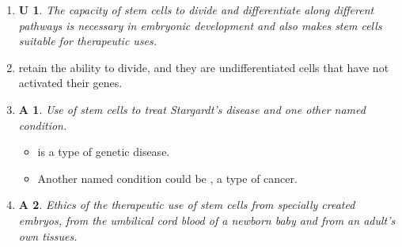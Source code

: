 \documentclass[12pt, a4paper]{article}
\newtheorem{und}{U}[subsection]
\newtheorem{app}{A}[subsection]
\begin{document}
\begin{enumerate}
    \item \begin{und} The capacity of stem cells to divide and differentiate along different pathways is necessary in embryonic development and also makes stem cells suitable for therapeutic uses.\end{und}
    \item \textbf{\color{red}{Stem cells}} retain the ability to divide, and they are undifferentiated cells that have not activated their genes. 
    \item \begin{app} Use of stem cells to treat Stargardt's disease and one other named condition. \end{app}
    \begin{itemize}
        \item \textbf{\color{red}{Stargardt's disease}} is a type of genetic disease. 
        \item Another named condition could be \textbf{\color{red}{Leukemia}}, a type of cancer. 
    \end{itemize}
    \item \begin{app} Ethics of the therapeutic use of stem cells from specially created embryos, from the umbilical cord blood of a newborn baby and from an adult's own tissues. \end{app}
\end{enumerate}
\end{document}
